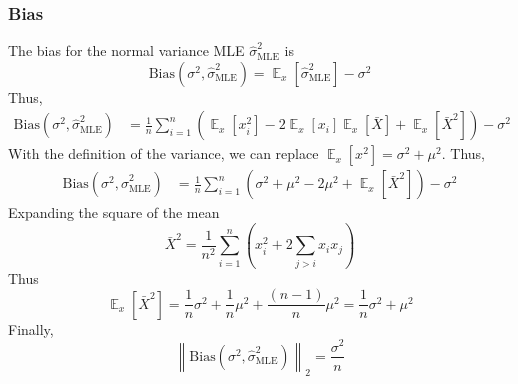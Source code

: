 \documentclass{article}
\DeclareMathOperator{\E}{\mathbb{E}}
\numberwithin{equation}{section}
\newcommand{\norm}[1]{\left\lVert#1\right\rVert_2}
\newcommand{\mle}[1]{\hat{#1}_{\text{MLE}}}
\begin{document}
\subsubsection{Bias}
The bias for the normal variance MLE $\mle{\sigma}^2$ is
 \[
         \text{Bias}(\sigma^2, \mle{\sigma}^2) = \E_x[\mle{\sigma}^2] - \sigma^2 
\]
Thus,
\begin{align*}
        \text{Bias}(\sigma^2, \mle{\sigma}^2) &= 
        \frac{1}{n}\sum_{i = 1}^n (\E_x[x_i^2] - 2 \E_x[x_i]\E_x[\bar{X}] + \E_x[\bar{X}^2]) 
        - \sigma^2
\end{align*} 
With the definition of the variance, we can replace $\E_x[x^2] = \sigma^2 + \mu^2$.
Thus,
 \begin{align*}
         \text{Bias}(\sigma^2, \mle{\sigma}^2) &= 
        \frac{1}{n}\sum_{i = 1}^n (\sigma^2 + \mu^2 - 2 \mu^2 + \E_x[\bar{X}^2]) - \sigma^2
\end{align*} 
Expanding the square of the mean
\[
\bar{X}^2 = \frac{1}{n^2}\sum_{i = 1}^n
\left(  x_i^2 + 2\sum_{j > i}x_ix_j
\right)
\]
Thus
\[
        \E_x[\bar{X}^2] = \frac{1}{n}\sigma^2 + \frac{1}{n}\mu^2 + \frac{(n - 1)}{n}\mu^2 =
                \frac{1}{n}\sigma^2 + \mu^2
\]
Finally,
\[
        \norm{\text{Bias}(\sigma^2, \mle{\sigma}^2)} = \frac{\sigma^2}{n} 
\]
\end{document}
